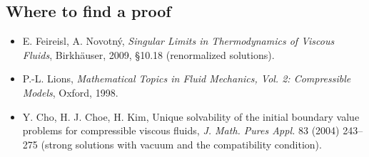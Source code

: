 \subsection*{Where to find a proof}

\begin{itemize}
\item E. Feireisl, A. Novotný, \emph{Singular Limits in Thermodynamics of Viscous Fluids}, Birkhäuser, 2009, §10.18 (renormalized solutions).
\item P.-L. Lions, \emph{Mathematical Topics in Fluid Mechanics, Vol. 2: Compressible Models}, Oxford, 1998.
\item Y. Cho, H. J. Choe, H. Kim, Unique solvability of the initial boundary value problems for compressible viscous fluids, \emph{J. Math. Pures Appl.} 83 (2004) 243--275 (strong solutions with vacuum and the compatibility condition).
\end{itemize}

\neededfor
